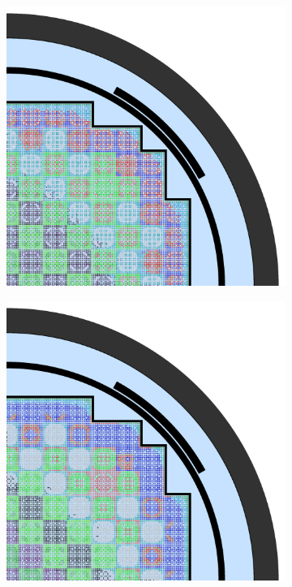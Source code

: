 \begin{appendices}
\begin{figure}[h!]
\begin{subfigure}{0.48\textwidth}
  \caption{}
  \label{fig:no-features-full-core-combined-2}
\end{subfigure}
\begin{subfigure}{0.48\textwidth}
  \centering
  \includegraphics[width=0.85\linewidth]{figures/unsupervised/geometries/without-features/4-clusters/pinch/full-core}
  \caption{}
  \label{fig:no-features-full-core-pinch-4}
\end{subfigure}%
\begin{subfigure}{0.48\textwidth}
  \centering
  \includegraphics[width=0.85\linewidth]{figures/unsupervised/geometries/without-features/4-clusters/combined/full-core}

\end{subfigure}
\end{figure}
\end{appendices}
